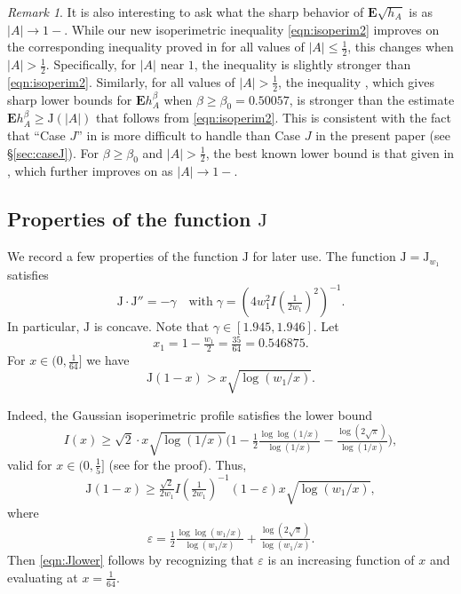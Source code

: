 \documentclass[11pt]{amsart}
\theoremstyle{plain}
\theoremstyle{definition}
\theoremstyle{remark}
\newtheorem{rem}[thm]{Remark}
\numberwithin{equation}{section}
\begin{document}
\begin{rem}
It is also interesting to ask what the sharp behavior of $\mathbf{E}\sqrt{h_A}$ is as $|A|\to 1-$.
While our new isoperimetric inequality \eqref{eqn:isoperim2} improves on the corresponding inequality proved in \cite[(2.7)]{DIR24} for all values of $|A|\le \frac12$, this changes when $|A|>\frac12$.
Specifically, for $|A|$ near $1$, the inequality \cite[(2.7)]{DIR24} is slightly stronger than \eqref{eqn:isoperim2}.
Similarly, for all values of $|A|>\frac12$, the inequality \cite[(2.6)]{DIR24}, which gives sharp lower bounds for $\mathbf{E}h_A^\beta$ when $\beta\ge \beta_0=0.50057$, is stronger than the estimate $\mathbf{E} h_A^\beta\ge {\mathrm{J}}(|A|)$ that follows from \eqref{eqn:isoperim2}. This is consistent with the fact that ``Case $J$'' in \cite[\S 6]{DIR24} is more difficult to handle than Case $J$ in the present paper (see \S \ref{sec:caseJ}). For $\beta\ge\beta_0$ and $|A|>\frac12$, the best known lower bound is that given in \cite[Thm. 1.6]{DIR24}, which further improves on \cite[(2.6)]{DIR24} as $|A|\to 1-$.
\end{rem}

\subsection{\texorpdfstring{Properties of the function ${\mathrm{J}}$}{Properties of the function J}}\label{sec:prelimJ}
We record a few properties of the function ${\mathrm{J}}$ for later use.
The function ${\mathrm{J}}={\mathrm{J}}_{w_1}$ satisfies
\[{\mathrm{J}}\cdot {\mathrm{J}}'' = -\gamma\quad \text{with}\;\gamma=(4w_1^2I(\tfrac{1}{2w_1})^2)^{-1}.\]
In particular, ${\mathrm{J}}$ is concave.
Note that $\gamma\in [1.945, 1.946]$.
Let
\[x_1 = 1-\tfrac{w_1}{2}= \tfrac{35}{64} = 0.546875.\]
For $x\in (0,\tfrac{1}{64}]$ we have
\begin{equation}\label{eqn:Jlower}
\mathrm{J}(1-x)>x\sqrt{\log(w_1/x)}.
\end{equation}

Indeed, the Gaussian isoperimetric profile satisfies the lower bound
\[I(x)\ge \sqrt{2}\cdot x\sqrt{\log(1/x)} \Big(1-\tfrac{1}{2}\tfrac{\log \log (1/x)}{\log (1/x)} - \tfrac{\log (2\sqrt{\pi})}{\log(1/x)} \Big), \]
valid for $x\in (0,\frac15]$ (see \cite[Proposition 5.11]{DIR24} for the proof).
Thus,
\[{\mathrm{J}}(1-x) \ge \tfrac{\sqrt{2}}{2w_1}I(\tfrac{1}{2w_1})^{-1} (1-\varepsilon) x\sqrt{\log(w_1/x)},\]
where
\[\varepsilon = \tfrac{1}{2}\tfrac{\log \log (w_1/x)}{\log (w_1/x)} + \tfrac{\log (2\sqrt{\pi})}{\log(w_{1}/x)}. \]
Then \eqref{eqn:Jlower} follows by recognizing that $\varepsilon$ is an increasing function of $x$ and evaluating at $x=\frac1{64}$.
\end{document}
